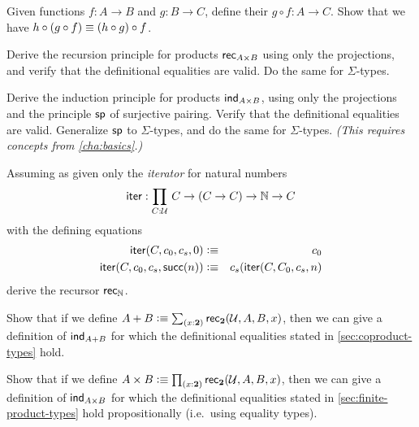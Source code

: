 \sectionExercises

\begin{ex}\label{ex:composition}
  Given functions $f:A\to B$ and $g:B\to C$, define their 
 $g\circ f:A\to C$.
  Show that we have $h \circ (g\circ f) \equiv (h\circ g)\circ f$.
\end{ex}

\begin{ex}
  Derive the recursion principle for products $\mathsf{rec}_{A\times B} $ using only the projections, and verify that the definitional equalities are valid.
  Do the same for $\Sigma$-types.
\end{ex}

\begin{ex}
  Derive the induction principle for products $\mathsf{ind}_{A\times B}$, using only the projections and the principle $\mathsf{sp}$ of surjective pairing.
  Verify that the definitional equalities are valid.
  Generalize $\mathsf{sp}$ to $\Sigma$-types, and do the same for $\Sigma$-types.
  \emph{(This requires concepts from \autoref{cha:basics}.)}
\end{ex}

\begin{ex}
Assuming as given only the \emph{iterator} for natural numbers
\[\ite : \prd{C:\UU} C \to (C \to C) \to \nat \to C \]
with the defining equations
\begin{eqnarray*}
\mathsf{iter}(C,c_0,c_s,0)  & \vcentcolon\equiv & c_0 \\
\mathsf{iter}(C,c_0,c_s,\mathsf{succ}(n)) & \vcentcolon\equiv & c_s(\mathsf{iter}(C,C_0,c_s,n)  
\end{eqnarray*}
derive the recursor $\mathsf{rec}_{\mathbb{N}}$.
\end{ex}

\begin{ex}\label{ex:sum-via-bool}
%
Show that if we define $A + B \defeq \sm{x:\bool} \rec{\bool}(\UU,A,B,x)$, then we can give a definition of $\mathsf{ind}_{A+B}$ for which the definitional equalities stated in \autoref{sec:coproduct-types} hold.
\end{ex}

\begin{ex}\label{ex:prod-via-bool}
%
Show that if we define $A \times B \defeq \prd{x:\bool}\rec{\bool}(\UU,A,B,x)$, then we can give a definition of  $\mathsf{ind}_{A\times B}$ for which the definitional equalities stated in \autoref{sec:finite-product-types} hold propositionally (i.e.\ using equality types).
\end{ex}

